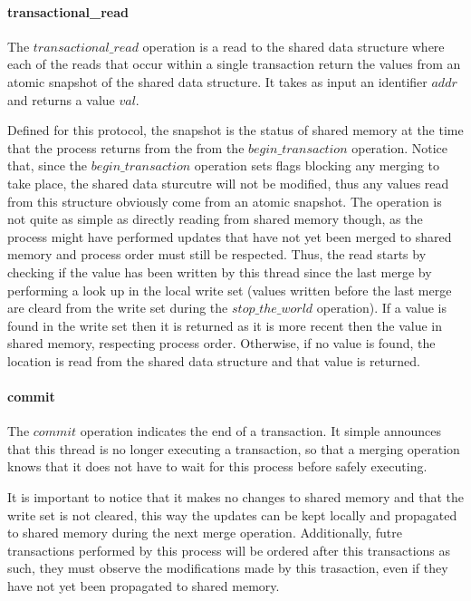\documentclass[11pt,letterpaper]{article}
\begin{document}
\paragraph{transactional\_read}
The $\mathit{transactional\_read}$ operation is a read to the shared data structure
where each of the reads that occur within a single transaction return the values from
an atomic snapshot of the shared data structure.
It takes as input an identifier $\mathit{addr}$ and returns a value $\mathit{val}$.

Defined for this protocol, the snapshot is the status of shared memory at the time that
the process returns from the from the $\mathit{begin\_transaction}$ operation.
Notice that, since the $\mathit{begin\_transaction}$ operation
sets flags blocking any merging to take place, the shared data sturcutre
will not be modified, thus any values read from this structure obviously come from
an atomic snapshot.
The operation is not quite as simple as directly reading from shared memory though,
as the process might have performed updates that have not yet been merged to shared memory
and process order must still be respected.
Thus, the read starts by checking if the value has been written by this
thread since the last merge by performing a look up in the local write set
(values written before the last merge are cleard from the write set during
the $\mathit{stop\_the\_world}$ operation).
If a value is found in the write set then it is returned as it is more recent
then the value in shared memory, respecting process order.
Otherwise, if no value is found,
the location is read from the shared data structure and that value is returned.



\paragraph{commit}
The $\mathit{commit}$ operation indicates the end of a transaction.
It simple announces that this thread is no longer executing a transaction,
so that a merging operation knows that it does not have to wait for this process
before safely executing.

It is important to notice that it makes no changes to shared memory and that the write set is not cleared,
this way the updates can be kept locally and propagated to shared memory during the next merge operation.
Additionally, futre transactions performed by this process will be ordered after this
transactions as such, they must observe the modifications made by this trasaction, even if they
have not yet been propagated to shared memory.
\end{document}
